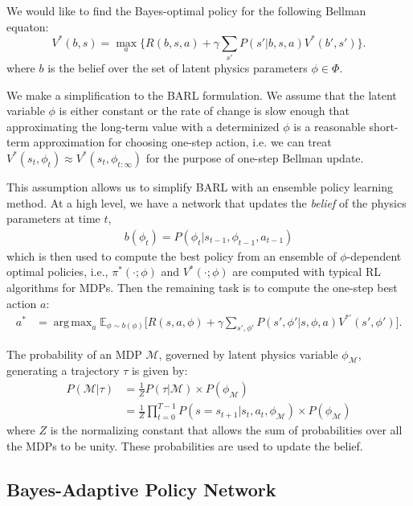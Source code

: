\documentclass{article}
\DeclareMathOperator*{\argmax}{arg\,max}
\begin{document}
We would like to find the Bayes-optimal policy for the following Bellman equaton:
\begin{equation}\label{eq:rl}
V^*(b, s) = \max_a \bigg\{R(b, s, a) + \gamma \sum_{s'}P(s'|b, s, a)V^*(b', s') \bigg\}.
\end{equation}
where $b$ is the belief over the set of latent physics parameters $\phi \in \Phi$.

We make a simplification to the BARL formulation. We assume that the latent variable $\phi$ is either constant or the rate of change is slow enough that approximating the long-term value with a determinized $\phi$ is a reasonable short-term approximation for choosing one-step action, i.e. we can treat $V^*(s_t, \phi_t) \approx V^*(s_t, \phi_{t:\infty})$ for the purpose of one-step Bellman update.

This assumption allows us to simplify BARL with an ensemble policy learning method. At a high level, we have a network that updates the \emph{belief} of the physics parameters at time $t$,
\begin{align*}
b(\phi_t) = P(\phi_t|s_{t-1}, \phi_{t-1}, a_{t-1})
\end{align*}
which is then used to compute the best policy from an ensemble of $\phi$-dependent optimal policies, i.e., $\pi^*(\cdot;\phi)$ and $V^*(\cdot;\phi)$ are computed with typical RL algorithms for MDPs. Then the remaining task is to compute the one-step best action $a$:
\begin{align}\label{eq:barl}
 a^* &= \argmax_{a} \mathbb{E}_{\phi \sim b(\phi)} \bigg[R(s, a, \phi) + \gamma \sum_{s', \phi'}P(s',\phi'|s, \phi, a)V^{*'}(s', \phi') \bigg].
\end{align}

The probability of an MDP $\mathcal{M}$, governed by latent physics variable $\phi_{\mathcal{M}}$, generating a trajectory $\tau$ is given by:
\begin{align}
P(\mathcal{M} | \tau) &= \frac{1}{Z}P(\tau | \mathcal{M}) \times P(\phi_\mathcal{M}) \nonumber \\
					  &= \frac{1}{Z}\prod_{t = 0}^{T-1}{P(s = s_{t+1}|s_t, a_t, \phi_\mathcal{M})} \times P(\phi_\mathcal{M})
\end{align}
where $Z$ is the normalizing constant that allows the sum of probabilities over all the MDPs to be unity. These probabilities are used to update the belief.

\subsection{Bayes-Adaptive Policy Network}
\end{document}

